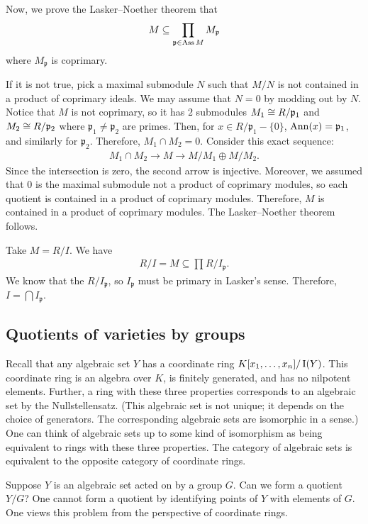 \documentclass[11pt, oneside,margin=1in]{article}
\begin{document}
Now, we prove the Lasker--Noether theorem that 
\begin{align*}
	M\subseteq \prod_{\mathfrak{p} \in \operatorname{Ass} M} M_{\mathfrak{p}}
\end{align*}
where $M_{\mathfrak{p}}$ is coprimary.  

If it is not true, pick a maximal submodule $N$ such that $M/N$ is not contained in a product of coprimary ideals. We may assume that $N=0$ by modding out by $N$. Notice that $M$ is not coprimary, so it has $2$ submodules $M_1\cong R/\mathfrak{p}_1$ and $M_2\cong R/\mathfrak{p}_2$ where $\mathfrak{p}_1\ne \mathfrak{p}_2$ are primes. Then, for $x\in R/\mathfrak{p}_1- \{0\}$, $\operatorname{Ann}(x)= \mathfrak{p}_1$, and similarly for $\mathfrak{p}_2$. Therefore, $M_1\cap M_2=0$. Consider this exact sequence:
\begin{align*}
	M_1\cap M_2 \longrightarrow M\longrightarrow M/M_1 \oplus M/M_2.
\end{align*}
Since the intersection is zero, the second arrow is injective. Moreover, we assumed that $0$ is the maximal submodule not a product of coprimary modules, so each quotient is contained in a product of coprimary modules. Therefore, $M$ is contained in a product of coprimary modules. The Lasker--Noether theorem follows.

Take $M=R/I$. We have 
\begin{align*}
	R/I = M \subseteq \prod_{} R/I_{\mathfrak{p}}.
\end{align*}
We know that the $R/I_{\mathfrak{p}}$, so $I_\mathfrak{p}$ must be primary in Lasker's sense. Therefore, $I=\bigcap I_\mathfrak{p}$.
\subsection{Quotients of varieties by groups}
Recall that any algebraic set $Y$ has a coordinate ring $K[x_1,\hdots, x_n]/\operatorname{I}(Y)$. This coordinate ring is an algebra over $K$, is finitely generated, and has no nilpotent elements. Further, a ring with these three properties corresponds to an algebraic set by the Nullstellensatz. (This algebraic set is not unique; it depends on the choice of generators. The corresponding algebraic sets are isomorphic in a sense.) One can think of algebraic sets up to some kind of isomorphism as being equivalent to rings with these three properties. The category of algebraic sets is equivalent to the opposite category of coordinate rings. 

Suppose $Y$ is an algebraic set acted on by a group $G$. Can we form a quotient $Y/G$? One cannot form a quotient by identifying points of $Y$ with elements of $G$. One views this problem from the perspective of coordinate rings. 
\end{document}
